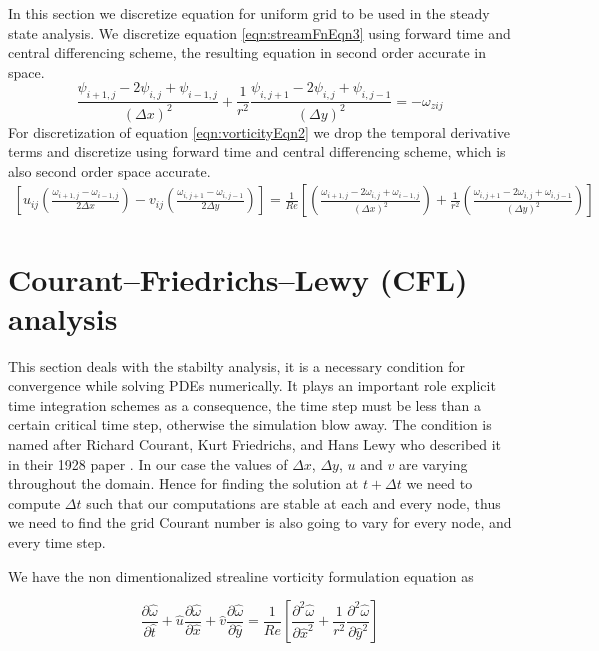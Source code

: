 \documentclass{article}
\begin{document}
In this section we discretize equation for uniform grid to be used in the steady state analysis. We discretize equation \ref{eqn:streamFnEqn3} using forward time and central differencing scheme, the resulting equation in second order accurate in space.
\begin{equation}
\frac{\psi_{i+1,j}-2\psi_{i,j}+\psi_{i-1,j} }{(\Delta x)^2} + \frac{1}{r^2}\frac{\psi_{i,j+1}-2\psi_{i,j}+\psi_{i,j-1}}{(\Delta y)^2} = -\omega_{zij}
\end{equation}
For discretization of equation \ref{eqn:vorticityEqn2} we drop the temporal derivative terms and discretize using forward time and central differencing scheme, which is also second order space accurate. 
\begin{equation} 
\begin{split}
\left[u_{ij}\left(\frac{\omega_{i+1,j}-\omega_{i-1,j}}{2\Delta x}\right) - v_{ij}\left(\frac{\omega_{i,j+1}-\omega_{i,j-1}}{2\Delta y}\right)  \right]
  = \frac{1}{Re}\left[\left(\frac{\omega_{i+1,j}-2\omega_{i,j}+\omega_{i-1,j}}{(\Delta x)^2}\right)+\frac{1}{r^2}\left(\frac{\omega_{i,j+1}-2\omega_{i,j}+\omega_{i,j-1}}{(\Delta y)^2}\right) \right]
\end{split}
\end{equation}


\section{Courant–Friedrichs–Lewy (CFL) analysis}
This section deals with the stabilty analysis, it is a necessary condition for convergence while solving PDEs numerically. It plays an important role explicit time integration schemes as a consequence, the time step must be less than a certain critical time step, otherwise the simulation blow away. The condition is named after Richard Courant, Kurt Friedrichs, and Hans Lewy who described it in their 1928 paper \citep{cfl}.
In our case the values of $\Delta x$, $\Delta y$, $u$ and $v$ are varying throughout the domain. Hence for finding the solution at $t+\Delta t$ we need to compute $\Delta t$ such that our computations are stable at each and every node, thus we need to find the grid Courant number is also going to vary for every node, and every time step. 

We have the non dimentionalized strealine vorticity formulation equation as

\begin{equation}
\frac{\partial \hat{\omega}}{\partial \hat{t}} + \hat{u}\frac{\partial \hat{\omega}}{\partial \hat{x}} +\hat{ v}\frac{\partial \hat{\omega}}{\partial \hat{y}}= \frac{1}{Re} \left [ \frac{\partial^2 \hat{\omega}}{\partial \hat{x}^2} +  \frac{1}{r^2}\frac{\partial^2 \hat{\omega}}{\partial \hat{y}^2} \right ]
\end{equation}
\end{document}
